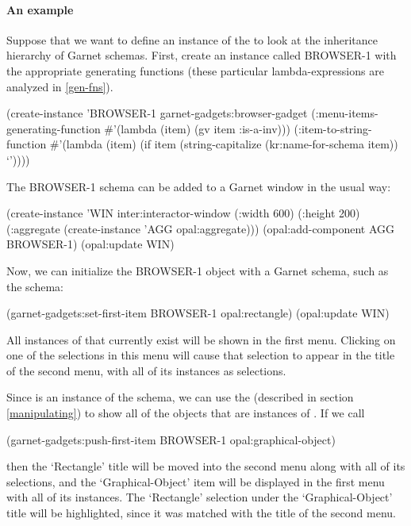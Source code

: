 \paragraph{An example}
\label{browser1-example} Suppose that we want to define an instance of
the  to look at the inheritance hierarchy of Garnet
schemas.  First, create an instance called BROWSER-1 with the
appropriate generating functions (these particular lambda-expressions
are analyzed in \ref{gen-fns}).
\begin{group}
\begin{programexample}
(create-instance 'BROWSER-1 garnet-gadgets:browser-gadget
   (:menu-items-generating-function \#'(lambda (item)
					(gv item :is-a-inv)))
   (:item-to-string-function \#'(lambda (item)
				 (if item
				     (string-capitalize (kr:name-for-schema item))
				     `'))))
\end{programexample}
\end{group}
The BROWSER-1 schema can be added to a Garnet window in the usual way:
\begin{group}
\begin{programexample}
(create-instance 'WIN inter:interactor-window
   (:width 600) (:height 200)
   (:aggregate (create-instance 'AGG opal:aggregate)))
(opal:add-component AGG BROWSER-1)
(opal:update WIN)
\end{programexample}
\end{group}

Now, we can initialize the BROWSER-1 object with a Garnet schema, such
as the  schema:
\begin{group}
\begin{programexample}
(garnet-gadgets:set-first-item BROWSER-1 opal:rectangle)
(opal:update WIN)
\end{programexample}
\end{group}
All instances of  that currently exist
will be shown in the first menu.  Clicking on one of the selections in
this menu will cause that selection to appear in the title of the
second menu, with all of its instances as selections.

Since  is an instance of the 
schema, we can use the
{\bf {}} (described in section \ref{manipulating}) to
show all of the objects that are instances of .
If we call
\begin{programexample}
(garnet-gadgets:push-first-item BROWSER-1 opal:graphical-object)
\end{programexample}
then the `Rectangle' title will be moved into the
second menu along with all of its selections, and the
`Graphical-Object' item will be displayed in the first menu with all
of its instances.  The `Rectangle' selection under the
`Graphical-Object' title will be highlighted, since it was matched
with the title of the second menu.


